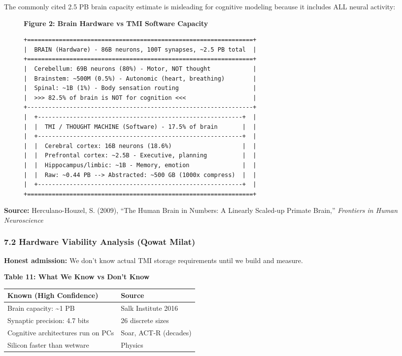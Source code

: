 \documentclass[
  11pt,
]{article}
\newcounter{none} %
\begin{document}
The commonly cited 2.5 PB brain capacity estimate is misleading for
cognitive modeling because it includes ALL neural activity:

\begin{figure}[H]
\centering
\textbf{Figure 2: Brain Hardware vs TMI Software Capacity}
\begin{verbatim}
+================================================================+
|  BRAIN (Hardware) - 86B neurons, 100T synapses, ~2.5 PB total  |
+================================================================+
|  Cerebellum: 69B neurons (80%) - Motor, NOT thought            |
|  Brainstem: ~500M (0.5%) - Autonomic (heart, breathing)        |
|  Spinal: ~1B (1%) - Body sensation routing                     |
|  >>> 82.5% of brain is NOT for cognition <<<                   |
+----------------------------------------------------------------+
|  +----------------------------------------------------------+  |
|  |  TMI / THOUGHT MACHINE (Software) - 17.5% of brain       |  |
|  +----------------------------------------------------------+  |
|  |  Cerebral cortex: 16B neurons (18.6%)                    |  |
|  |  Prefrontal cortex: ~2.5B - Executive, planning          |  |
|  |  Hippocampus/limbic: ~1B - Memory, emotion               |  |
|  |  Raw: ~0.44 PB --> Abstracted: ~500 GB (1000x compress)  |  |
|  +----------------------------------------------------------+  |
+================================================================+
\end{verbatim}
\end{figure}

\textbf{Source:} Herculano-Houzel, S. (2009), ``The Human Brain in
Numbers: A Linearly Scaled-up Primate Brain,'' \emph{Frontiers in Human
Neuroscience}

\subsubsection{7.2 Hardware Viability Analysis (Qowat
Milat)}\label{hardware-viability-analysis-qowat-milat}

\textbf{Honest admission:} We don't know actual TMI storage requirements
until we build and measure.

\textbf{Table 11: What We Know vs Don't Know}

{\def\LTcaptype{none} %
\begin{longtable}[]{@{}ll@{}}
\toprule\noalign{}
Known (High Confidence) & Source \\
\midrule\noalign{}
\endhead
\bottomrule\noalign{}
\endlastfoot
Brain capacity: \textasciitilde1 PB & Salk Institute 2016 \\
Synaptic precision: 4.7 bits & 26 discrete sizes \\
Cognitive architectures run on PCs & Soar, ACT-R (decades) \\
Silicon faster than wetware & Physics \\
\end{longtable}
}
\end{document}
